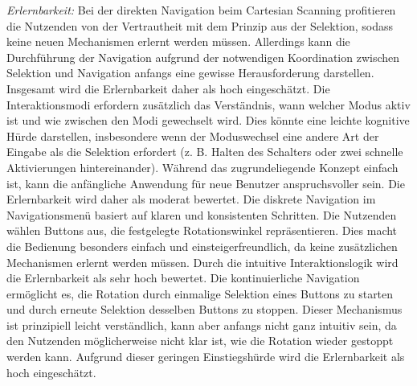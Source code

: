 \textit{Erlernbarkeit:} 
Bei der direkten Navigation beim Cartesian Scanning profitieren die Nutzenden von der Vertrautheit mit dem Prinzip aus der Selektion, sodass keine neuen Mechanismen erlernt werden müssen. Allerdings kann die Durchführung der Navigation aufgrund der notwendigen Koordination zwischen Selektion und Navigation anfangs eine gewisse Herausforderung darstellen. Insgesamt wird die Erlernbarkeit daher als hoch eingeschätzt. Die Interaktionsmodi erfordern zusätzlich das Verständnis, wann welcher Modus aktiv ist und wie zwischen den Modi gewechselt wird. Dies könnte eine leichte kognitive Hürde darstellen, insbesondere wenn der Moduswechsel eine andere Art der Eingabe als die Selektion erfordert (z. B. Halten des Schalters oder zwei schnelle Aktivierungen hintereinander). Während das zugrundeliegende Konzept einfach ist, kann die anfängliche Anwendung für neue Benutzer anspruchsvoller sein. Die Erlernbarkeit wird daher als moderat bewertet.
Die diskrete Navigation im Navigationsmenü basiert auf klaren und konsistenten Schritten. Die Nutzenden wählen Buttons aus, die festgelegte Rotationswinkel repräsentieren. Dies macht die Bedienung besonders einfach und einsteigerfreundlich, da keine zusätzlichen Mechanismen erlernt werden müssen. Durch die intuitive Interaktionslogik wird die Erlernbarkeit als sehr hoch bewertet.
Die kontinuierliche Navigation ermöglicht es, die Rotation durch einmalige Selektion eines Buttons zu starten und durch erneute Selektion desselben Buttons zu stoppen. Dieser Mechanismus ist prinzipiell leicht verständlich, kann aber anfangs nicht ganz intuitiv sein, da den Nutzenden möglicherweise nicht klar ist, wie die Rotation wieder gestoppt werden kann. Aufgrund dieser geringen Einstiegshürde wird die Erlernbarkeit als hoch eingeschätzt.

